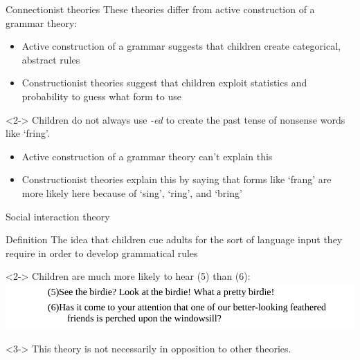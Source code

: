\documentclass{beamer}
\begin{document}
        \begin{frame}{Connectionist theories}
            These theories differ from active construction of a grammar theory:
            \begin{itemize}
                \item Active construction of a grammar suggests that children create categorical, abstract rules
                \item Constructionist theories suggest that children exploit statistics and probability to guess what form to use
            \end{itemize}
            \begin{example}<2->
                Children do not always use \emph{-ed} to create the past tense of nonsense words like `fring'.
            \end{example}
            \begin{itemize}
                \item<3-> Active construction of a grammar theory can't explain this
                \item<3-> Constructionist theories explain this by saying that forms like `frang' are more likely here because of `sing', `ring', and `bring'
            \end{itemize}
        \end{frame}
        \begin{frame}{Social interaction theory}
            \begin{block}{Definition}
                The idea that children cue adults for the sort of language input they require in order to develop grammatical rules
            \end{block}
            \begin{example}<2->
                Children are much more likely to hear (5) than (6):
                \includegraphics[scale=0.45]{Birdie.PNG}
            \end{example}
            \begin{alertblock}<3->{}
                This theory is not necessarily in opposition to other theories.
            \end{alertblock}
        \end{frame}
\end{document}
